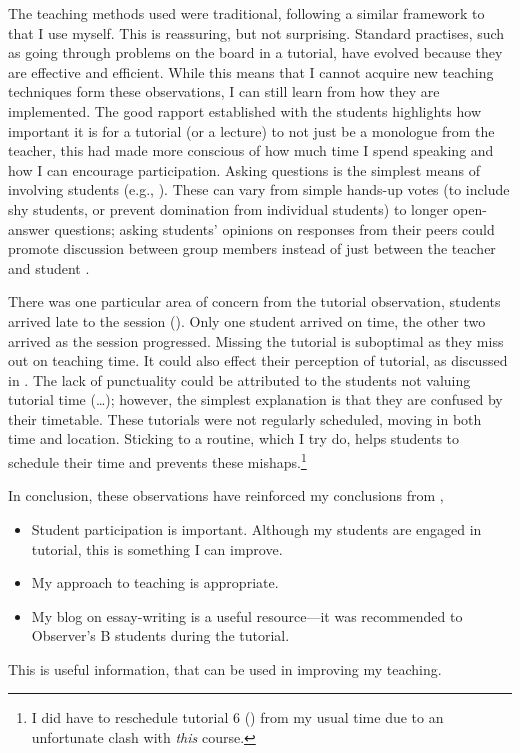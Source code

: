 The teaching methods used were traditional, following a similar framework to that I use myself. This is reassuring, but not surprising. Standard practises, such as going through problems on the board in a tutorial, have evolved because they are effective and efficient. While this means that I cannot acquire new teaching techniques form these observations, I can still learn from how they are implemented. The good rapport established with the students highlights how important it is for a tutorial (or a lecture) to not just be a monologue from the teacher, this had made more conscious of how much time I spend speaking and how I can encourage participation. Asking questions is the simplest means of involving students (e.g., ). These can vary from simple hands-up votes (to include shy students, or prevent domination from individual students) to longer open-answer questions; asking students' opinions on responses from their peers could promote discussion between group members instead of just between the teacher and student \citep[cf.]{Foster1981}. 

There was one particular area of concern from the tutorial observation, students arrived late to the session (). Only one student arrived on time, the other two arrived as the session progressed. Missing the tutorial is suboptimal as they miss out on teaching time. It could also effect their perception of tutorial, as discussed in . The lack of punctuality could be attributed to the students not valuing tutorial time (\ldots); however, the simplest explanation is that they are confused by their timetable. These tutorials were not regularly scheduled, moving in both time and location. Sticking to a routine, which I try do, helps students to schedule their time and prevents these mishaps.\footnote{I did have to reschedule tutorial 6 () from my usual time due to an unfortunate clash with \emph{this} course.}

In conclusion, these observations have reinforced my conclusions from ,
\begin{itemize}
\item Student participation is important. Although my students are engaged in tutorial, this is something I can improve.
\item My approach to teaching is appropriate.
\item My blog on essay-writing is a useful resource---it was recommended to Observer's B students during the tutorial.
\end{itemize}
This is useful information, that can be used in improving my teaching.
